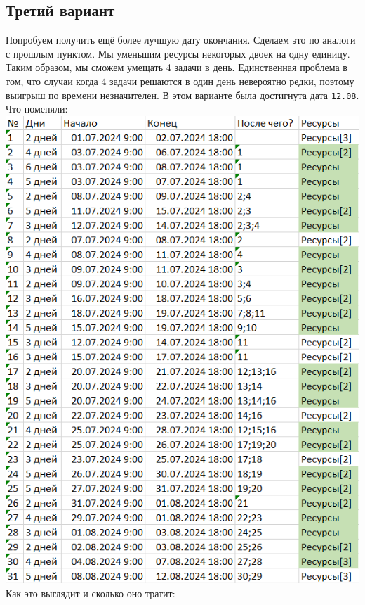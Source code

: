 \documentclass[14pt]{article}
\begin{document}
	\subsection{Третий вариант}
		Попробуем получить ещё более лучшую дату окончания.
		Сделаем это по аналоги с прошлым пунктом.
		Мы уменьшим ресурсы некогорых двоек на одну единицу.
		Таким образом, мы сможем умещать 4 задачи в день.
		Единственная проблема в том, что случаи когда 4 задачи решаются в один день невероятно редки,
			поэтому выигрыш по времени незначителен.
		В этом варианте была достигнута дата \texttt{12.08}.
		{\LARGE Что поменяли:}\\
		\includegraphics[height=0.6\textheight]{../img/2b3_days_change.png}\\ 
		{\LARGE Как это выглядит и сколько оно тратит:}\\
\end{document}
